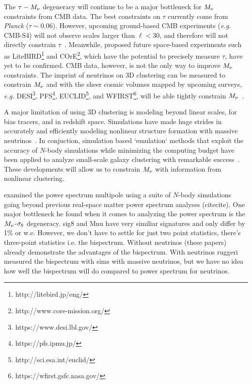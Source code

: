 The $\tau-M_\nu$ degeneracy will continue to be a major bottleneck 
for $M_\nu$ constraints from CMB data. The best constraints on $\tau$ 
currently come from {\em Planck} ($\tau\sim0.06$). However, upcoming 
ground-based CMB experiments ({\em e.g.} CMB-S4) will not observe scales 
larger than $\ell < 30$, and therefore will not directly constrain 
$\tau$~\citep{abazajian2016}. Meanwhile, proposed future space-based 
experiments such as LiteBIRD\footnote{http://litebird.jp/eng/} and 
COrE\footnote{http://www.core-mission.org/}, which have the potential 
to precisely measure $\tau$, have yet to be confirmed. CMB data, however, 
is not the only way to improve $M_\nu$ constraints. The imprint of 
neutrinos on 3D clustering can be measured to constrain $M_\nu$ and 
with the sheer cosmic volumes mapped by upcoming surveys, \emph{e.g.} 
DESI\footnote{https://www.desi.lbl.gov/}, PFS\footnote{https://pfs.ipmu.jp/}, 
EUCLID\footnote{http://sci.esa.int/euclid/}, and WFIRST\footnote{https://wfirst.gsfc.nasa.gov/}, 
will be able tightly constrain $M_\nu$~\citep{audren2013, font-ribera2014, petracca2016, sartoris2016, boyle2018}.

A major limitation of using 3D clustering is modeling beyond linear 
scales, for bias tracers, and in redshift space. Simulations have made
huge strides in accurately and efficiently modeling nonlinear structure
formation with massive neutrinos~\citep[\emph{e.g.}][]{brandbyge2008, 
villaescusa-navarro2013, castorina2015, adamek2017, emberson2017, villaescusa-navarro2018}. 
In conjuction, simulation based `emulation` methods that exploit the 
accuracy of $N$-body simulations while minimizing the computing budget 
have been applied to analyze small-scale galaxy clustering with remarkable 
success~\citep[\emph{e.g.}][]{heitmann2009, kwan2015, euclidcollaboration2018, mcclintock2018, zhai2018, wibking2019}. 
These developments will allow us to constrain $M_\nu$ with information 
from nonlinear clustering.

\cite{villaescusa-navarro2018} examined the power spectrum multipole 
using a suite of $N$-body simulations going beyond previous real-space 
matter power spectrum analyses (citecite). One major bottleneck he 
found when it comes to analyzing the power spectrum is the $M_\nu$-$\sigma_8$ degeneracy. 
sig8 and Mnu have very similiar signatures and only differ by 1\% or w.e. 
However, we don't have to settle for just two point statistics, there's three-point 
statistics i.e. the bispectrum. 
Without neutrinos (these papers) already demonstrate the advantages of the bispectrum. 
With neutrinos ruggeri measured the bispectrum with sims with massive neutrinos, 
but we have no idea how well the bispectrum will do compared to power spectrum 
for neutrinos.

